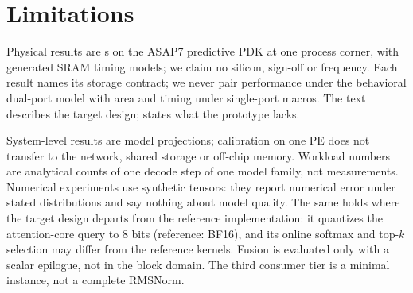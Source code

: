 
\section{Limitations}\label{sec:limits}

%
Physical results are \evPostRoute{}s on the ASAP7 predictive PDK at one process corner, with generated SRAM timing models; we claim no silicon, sign-off or frequency.
Each result names its \Lii storage contract; we never pair performance under the behavioral dual-port model with area and timing under single-port macros.
The text describes the target design;  states what the prototype lacks.

%
System-level results are model projections; calibration on one PE does not transfer to the network, shared storage or off-chip memory.
Workload numbers are analytical counts of one decode step of one model family, not measurements.
Numerical experiments use synthetic tensors: they report numerical error under stated distributions and say nothing about model quality.
The same holds where the target design departs from the reference implementation: it quantizes the attention-core query to 8 bits (reference: BF16), and its online softmax and top-$k$ selection may differ from the reference kernels.
Fusion is evaluated only with a scalar epilogue, not in the block domain.
The third consumer tier is a minimal instance, not a complete RMSNorm.
